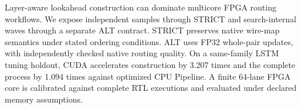 Layer-aware lookahead construction can dominate multicore FPGA routing workflows. We expose independent samples through STRICT and search-internal waves through a separate ALT contract. STRICT preserves native wire-map semantics under stated ordering conditions. ALT uses FP32 whole-pair updates, with independently checked native routing quality. On a same-family LSTM tuning holdout, CUDA accelerates construction by 3.207 times and the complete process by 1.094 times against optimized CPU Pipeline. A finite 64-lane FPGA core is calibrated against complete RTL executions and evaluated under declared memory assumptions. 
